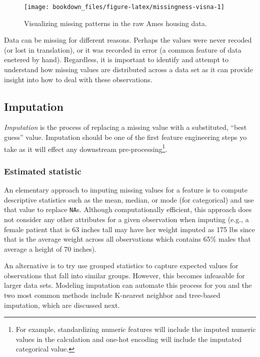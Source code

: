 \documentclass[]{krantz}
\begin{document}
\begin{figure}

{\centering \texttt{[image: bookdown\_files/figure-latex/missingness-visna-1]} 

}

\caption{Visualizing missing patterns in the raw Ames housing data.}\label{fig:missingness-visna}
\end{figure}

Data can be missing for different reasons. Perhaps the values were never recoded (or lost in translation), or it was recorded in error (a common feature of data enetered by hand). Regardless, it is important to identify and attempt to understand how missing values are distributed across a data set as it can provide insight into how to deal with these observations.

\hypertarget{impute}{%
\subsection{Imputation}\label{impute}}

\emph{Imputation} is the process of replacing a missing value with a substituted, ``best guess'' value. Imputation should be one of the first feature engineering steps yo take as it will effect any downstream pre-processing\footnote{For example, standardizing numeric features will include the imputed numeric values in the calculation and one-hot encoding will include the imputated categorical value.}.

\hypertarget{estimated-statistic}{%
\subsubsection{Estimated statistic}\label{estimated-statistic}}

An elementary approach to imputing missing values for a feature is to compute descriptive statistics such as the mean, median, or mode (for categorical) and use that value to replace \texttt{NA}s. Although computationally efficient, this approach does not consider any other attributes for a given observation when imputing (e.g., a female patient that is 63 inches tall may have her weight imputed as 175 lbs since that is the average weight across all observations which contains 65\% males that average a height of 70 inches).

An alternative is to try use grouped statistics to capture expected values for observations that fall into similar groups. However, this becomes infeasable for larger data sets. Modeling imputation can automate this process for you and the two most common methods include K-nearest neighbor and tree-based imputation, which are discussed next.
\end{document}
